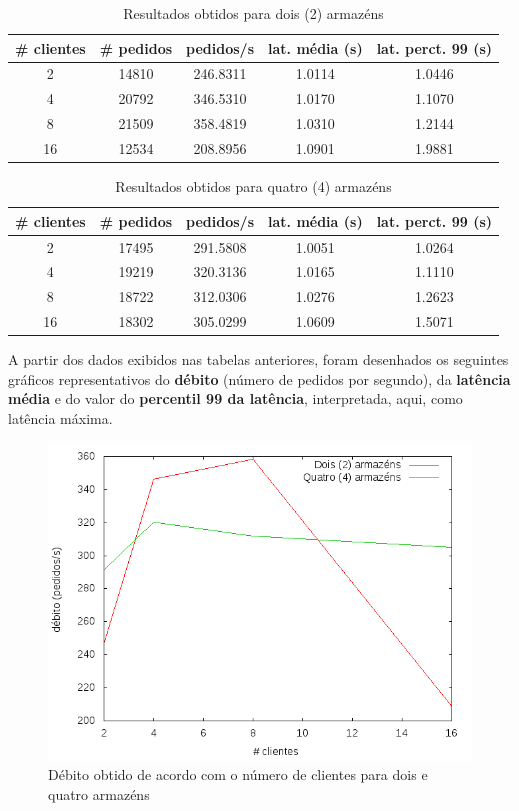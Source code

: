 \begin{table}[!h]
\center
\small
\begin{tabular}{|c|c|c|c|c|}
\hline
\textbf{\# clientes} & \textbf{\# pedidos} & \textbf{pedidos/s} & \textbf{lat. média (s)} & \textbf{lat. perct. 99 (s)}  \\ \hline
2 & 14810 & 246.8311 & 1.0114 & 1.0446  \\ \hline
4 & 20792 & 346.5310 & 1.0170 & 1.1070  \\ \hline
8 & 21509 & 358.4819 & 1.0310 & 1.2144  \\ \hline
16 & 12534 & 208.8956 & 1.0901 & 1.9881  \\ \hline
\end{tabular}
\caption{Resultados obtidos para dois (2) armazéns}
\end{table}

\begin{table}[!h]
\center
\small
\begin{tabular}{|c|c|c|c|c|}
\hline
\textbf{\# clientes} & \textbf{\# pedidos} & \textbf{pedidos/s} & \textbf{lat. média (s)} & \textbf{lat. perct. 99 (s)}  \\ \hline
2 & 17495 & 291.5808 & 1.0051 & 1.0264  \\ \hline
4 & 19219 & 320.3136 & 1.0165 & 1.1110  \\ \hline
8 & 18722 & 312.0306 & 1.0276 & 1.2623  \\ \hline
16 & 18302 & 305.0299 & 1.0609 & 1.5071  \\ \hline
\end{tabular}
\caption{Resultados obtidos para quatro (4) armazéns}
\end{table}

A partir dos dados exibidos nas tabelas anteriores, foram desenhados os seguintes gráficos representativos do \textbf{débito} (número de pedidos por segundo), da \textbf{latência média} e do valor do \textbf{percentil 99 da latência}, interpretada, aqui, como latência máxima.

\begin{figure}[!h]
\centering
\includegraphics[scale=.4]{img/questao-1/read-com-deb}
\caption{Débito obtido de acordo com o número de clientes para dois e quatro armazéns}
\end{figure}

